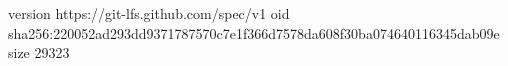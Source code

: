 version https://git-lfs.github.com/spec/v1
oid sha256:220052ad293dd9371787570c7e1f366d7578da608f30ba074640116345dab09e
size 29323
